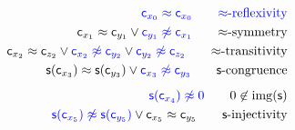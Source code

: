 	\begin{align*}
\colN \mc_{x_0} \mEQ \mc_{x_0}
\tag*{$\mEQ$-reflexivity}
\\
{\mc_{x_1} \mEQ \mc_{y_1}} \lor {\colN \mc_{y_1} \mNE \mc_{x_1}}
\tag*{$\mEQ$-symmetry}
\\
{\mc_{x_2} \mEQ \mc_{z_2}} \lor {\colN \mc_{x_2} \mNE \mc_{y_2}} \lor {\colN \mc_{y_2}\mNE \mc_{z_2}}
\tag*{$\mEQ$-transitivity}
\\
{ \msucc(\mc_{x_3}) \mEQ \msucc(\mc_{y_3})} \lor {\colN \mc_{x_3}\mNE \mc_{y_3}}
\tag*{$\msucc$-congruence}
\\[0.5em]
{\colN \msucc(\mc_{x_4})\mNE 0}
\tag*{$0\not\in\img(\msucc)$}
\\
{\colN \msucc(\mc_{x_5}) \mNE \msucc(\mc_{y_5})} \lor \mc_{x_5 }\mEQ \mc_{y_5}
\tag*{$\msucc$-injectivity}
\end{align*} 



%



